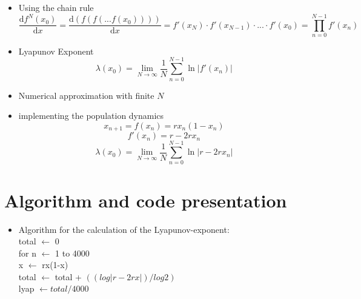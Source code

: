 \documentclass[ignorenonframetext]{beamer}
\newcommand{\dif}{\mathrm{d}}
\begin{document}
\begin{frame}
\begin{itemize}
\item Using the chain rule
\begin{equation}
\frac{\dif f^N(x_0)}{\dif x}=\frac{\dif (f(f(...f(x_0))))}{\dif x}=
f'(x_N)\cdot f'(x_{N-1})\cdot ...\cdot f'(x_0)=\prod\limits_{n=0}^{N-1} f'(x_n)
\end{equation}
\item Lyapunov Exponent
\begin{equation}
\lambda(x_0)=\lim \limits_{N\rightarrow\infty}\frac{1}{N}\sum\limits_{n=0}^{N-1}\ln|f'(x_n)|
\end{equation}
\item Numerical approximation with finite $N$ 
\end{itemize}
\end{frame}

\begin{frame}
\begin{itemize}
\item implementing the population dynamics
\begin{equation}
x_{n+1} = f(x_n)=rx_n(1-x_n)
\end{equation}
\begin{equation}
f'(x_n) = r-2rx_n
\end{equation}
\begin{equation}
\lambda(x_0)= \lim \limits_{N\rightarrow\infty}\frac{1}{N}\sum\limits_{n=0}^{N-1}\ln|r-2rx_n|
\end{equation}
\end{itemize}
\end{frame}

\section*{Algorithm and code presentation}
\begin{frame}
\begin{itemize}
\item Algorithm for the calculation of the Lyapunov-exponent: \\ total $\leftarrow$ 0 \\ for n $\leftarrow$ 1 to 4000 \\ x $\leftarrow$ rx(1-x) \\ total $\leftarrow$ total + $((log|r-2rx|)/log2)$ \\lyap $\leftarrow total/4000$
\end{itemize}
\end{frame}
\end{document}
